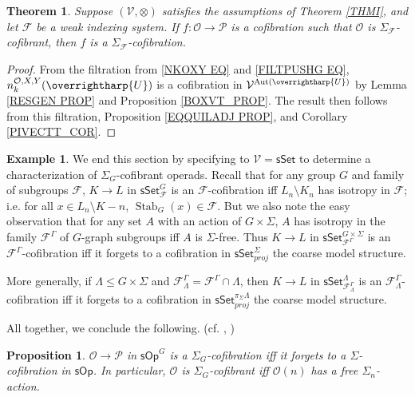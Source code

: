 \documentclass[a4paper,10pt
,draft
]{article}%
\numberwithin{equation}{section}
\numberwithin{figure}{section}
\newtheorem{theorem}[equation]{Theorem}%
\newtheorem{proposition}[equation]{Proposition}%
\theoremstyle{definition} %
\newtheorem{example}[equation]{Example}%
\newcommand{\vect}[1]{\text{\overrightharp{\ensuremath{#1}}}}
\newcommand{\sSet}{\ensuremath{\mathsf{sSet}}}%
\newcommand{\sOp}{\ensuremath{\mathsf{sOp}}}%
\DeclareMathOperator{\Aut}{Aut}%
\DeclareMathOperator{\Stab}{Stab}
\newcommand{\F}{\ensuremath{\mathcal F}}
\newcommand{\V}{\ensuremath{\mathcal V}}
\renewcommand{\O}{\ensuremath{\mathcal O}}
\renewcommand{\P}{\ensuremath{\mathcal P}}
\newcommand{\1}{\ensuremath{\mathbbm 1}}%
\begin{document}
\begin{theorem}
      \label{SIGMAG_COF_THM}
      Suppose $(\V, \otimes)$ satisfies the assumptions of Theorem \ref{THMI},
      and let $\F$ be a weak indexing system.
      If $f \colon \O \to \P$ is a cofibration such that $\O$ is $\Sigma_\F$-cofibrant, then $f$ is a $\Sigma_\F$-cofibration.
\end{theorem}
\begin{proof}
      From the filtration from \eqref{NKOXY EQ} and \eqref{FILTPUSHG EQ},
      $n_k^{\O,X,Y}(\vect U)$ is a cofibration in $\V^{\Aut(\vect U)}$
      by Lemma \ref{RESGEN PROP} and Proposition \ref{BOXVT_PROP}.
      The result then follows from
      this filtration, Proposition \ref{EQQUILADJ PROP}, and Corollary \ref{PIVECTT_COR}. %
\end{proof}





\begin{example}
      We end this section by specifying to $\V = \sSet$ to determine a characterization of $\Sigma_G$-cofibrant operads.
      Recall that for any group $G$ and family of subgroups $\F$,
      $K \to L$ in $\sSet^{G}_\F$ is an $\F$-cofibration iff $L_n \setminus K_n$ has isotropy in $\F$; i.e. for all $x \in L_n \setminus K-n$, $\Stab_{G}(x) \in \F$.
      But we also note the easy observation that for any set $A$ with an action of $G \times \Sigma$,
      $A$ has isotropy in the family $\F^\Gamma$ of $G$-graph subgroups
      iff
      $A$ is $\Sigma$-free.
      Thus $K \to L$ in $\sSet^{G \times \Sigma}_{\F^\Gamma}$ is an $\F^\Gamma$-cofibration
      iff
      it forgets to a cofibration in $\sSet^\Sigma_{proj}$ the coarse model structure.
      
      More generally, if $\Lambda \leq G \times \Sigma$ and $\F^\Gamma_{\Lambda} = \F^\Gamma \cap \Lambda$,
      then $K \to L$ in $\sSet^{\Lambda}_{\F^\Gamma_\Lambda}$ is an $\F^\Gamma_\Lambda$-cofibration
      iff
      it forgets to a cofibration in $\sSet^{\pi_{\Sigma}\Lambda}_{proj}$ the coarse model structure.
      
      All together, we conclude the following. (cf. \cite[Remark 6.7]{Per18}, \cite[discussion before Thm. 2.31]{BP_edss})
\end{example}

\begin{proposition}
      \label{SGS_COF_PROP}
      $\O \to \P$ in $\sOp^G$ is a $\Sigma_G$-cofibration iff it forgets to a $\Sigma$-cofibration in $\sOp$.
      In particular, $\O$ is $\Sigma_G$-cofibrant iff $\O(n)$ has a free $\Sigma_n$-action.
\end{proposition}
\end{document}
